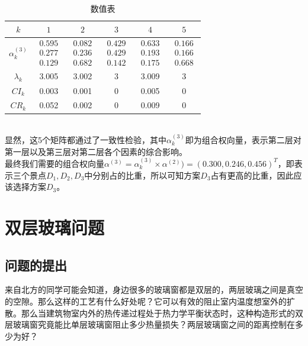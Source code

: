 \documentclass[openany]{progbookcn}
\begin{document}
\begin{table}[h]
\centering
\caption{数值表}
\begin{tabular}{|c|c|c|c|c|c|}
\hline
{$k$} & $1$ & $2$ & $3$ & $4$ & $5$ \\
\hline
{$\alpha_k^{(3)}$}& {$\begin{array}{*{20}{c}}0.595\\ 0.277\\ 0.129\end{array}$} & {$\begin{array}{*{20}{c}}0.082\\0.236\\0.682\end{array}$} & 
{$\begin{array}{*{20}{c}}0.429\\ 0.429\\ 0.142\end{array}$} & {$\begin{array}{*{20}{c}}0.633\\ 0.193\\ 0.175\end{array}$} & {$\begin{array}{*{20}{c}}0.166\\0.166\\0.668\end{array}$}  \\
\hline
{$\lambda_k$}&3.005 &3.002 & 3 & 3.009 & 3\\
\hline
{${CI}_{k}$}&0.003 &0.001 & 0 &0.005 & 0\\
\hline 
{${CR}_k$}&0.052 &0.002 &0 &0.009 & 0 \\
\hline
\end{tabular}
\end{table}
\\
\indent 显然，这5个矩阵都通过了一致性检验，其中$\alpha_k^{(3)}$即为组合权向量，表示第二层对第一层以及第三层对第二层各个因素的综合影响。\\
\indent 最终我们需要的组合权向量$\alpha^{(3)}=\alpha_k^{(3)}\times \alpha^{(2)})=(0.300,0.246,0.456)^T$，即表示三个景点$D_1,D_2,D_3$中分别占的比重，所以可知方案$D_3$占有更高的比重，因此应该选择方案$D_3$。
\section{双层玻璃问题}
\subsection{问题的提出}
\indent 来自北方的同学可能会知道，身边很多的玻璃窗都是双层的，两层玻璃之间是真空的空隙。那么这样的工艺有什么好处呢？它可以有效的阻止室内温度想室外的扩散。那么当建筑物室内外的热传递过程处于热力学平衡状态时，这种构造形式的双层玻璃窗究竟能比单层玻璃窗阻止多少热量损失？两层玻璃窗之间的距离控制在多少为好？
\end{document}
